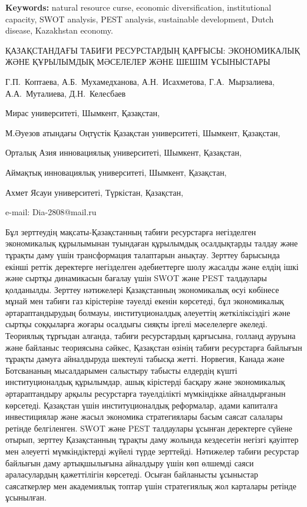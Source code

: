 {\bfseries Keywords:} natural resource curse, economic diversification,
institutional capacity, SWOT analysis, PEST analysis, sustainable
development, Dutch disease, Kazakhstan economy.

\begin{header}
ҚАЗАҚСТАНДАҒЫ ТАБИҒИ РЕСУРСТАРДЫҢ ҚАРҒЫСЫ: ЭКОНОМИКАЛЫҚ ЖӘНЕ ҚҰРЫЛЫМДЫҚ МӘСЕЛЕЛЕР ЖӘНЕ ШЕШІМ ҰСЫНЫСТАРЫ

Г.П.~Коптаева,
А.Б.~Мухамедханова\envelope,
А.Н.~Исахметова,
Г.А.~Мырзалиева,
А.А.~Муталиева,
Д.Н.~Келесбаев
\end{header}

\begin{affil}
Мирас университеті, Шымкент, Қазақстан,

М.Әуезов атындағы Оңтүстік Қазақстан университеті, Шымкент, Қазақстан,

Орталық Азия инновациялық университеті, Шымкент, Қазақстан,

Аймақтық инновациялық университеті, Шымкент, Қазақстан,

Ахмет Ясауи университеті, Түркістан, Қазақстан,

e-mail: Dia-2808@mail.ru
\end{affil}

Бұл зерттеудің мақсаты-Қазақстанның табиғи ресурстарға негізделген
экономикалық құрылымынан туындаған құрылымдық осалдықтарды талдау және
тұрақты даму үшін трансформация талаптарын анықтау. Зерттеу барысында
екінші реттік деректерге негізделген әдебиеттерге шолу жасалды және
елдің ішкі және сыртқы динамикасын бағалау үшін SWOT және PEST
талдаулары қолданылды. Зерттеу нәтижелері Қазақстанның экономикалық өсуі
көбінесе мұнай мен табиғи газ кірістеріне тәуелді екенін көрсетеді, бұл
экономикалық әртараптандырудың болмауы, институционалдық әлеуеттің
жеткіліксіздігі және сыртқы соққыларға жоғары осалдығы сияқты іргелі
мәселелерге әкеледі. Теориялық тұрғыдан алғанда, табиғи ресурстардың
қарғысына, голланд ауруына және байланыс теориясына сәйкес, Қазақстан
өзінің табиғи ресурстарға байлығын тұрақты дамуға айналдыруда шектеулі
табысқа жетті. Норвегия, Канада және Ботсвананың мысалдарымен салыстыру
табысты елдердің күшті институционалдық құрылымдар, ашық кірістерді
басқару және экономикалық әртараптандыру арқылы ресурстарға тәуелділікті
мүмкіндікке айналдырғанын көрсетеді. Қазақстан үшін институционалдық
реформалар, адами капиталға инвестициялар және жасыл экономика
стратегиялары басым саясат салалары ретінде белгіленген. SWOT және PEST
талдаулары ұсынған деректерге сүйене отырып, зерттеу Қазақстанның
тұрақты даму жолында кездесетін негізгі қауіптер мен әлеуетті
мүмкіндіктерді жүйелі түрде зерттейді. Нәтижелер табиғи ресурстар
байлығын даму артықшылығына айналдыру үшін көп өлшемді саяси
араласулардың қажеттілігін көрсетеді. Осыған байланысты ұсыныстар
саясаткерлер мен академиялық топтар үшін стратегиялық жол карталары
ретінде ұсынылған.

